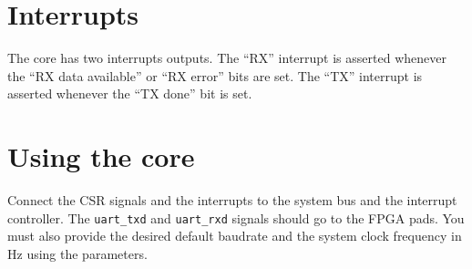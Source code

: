 \documentclass[a4paper,11pt]{article}
\begin{document}
\section{Interrupts}
The core has two interrupts outputs. The ``RX'' interrupt is asserted whenever the ``RX data available'' or ``RX error'' bits are set. The ``TX'' interrupt is asserted whenever the ``TX done'' bit is set.


\section{Using the core}
Connect the CSR signals and the interrupts to the system bus and the interrupt controller. The \verb!uart_txd! and \verb!uart_rxd! signals should go to the FPGA pads. You must also provide the desired default baudrate and the system clock frequency in Hz using the parameters.
\end{document}
